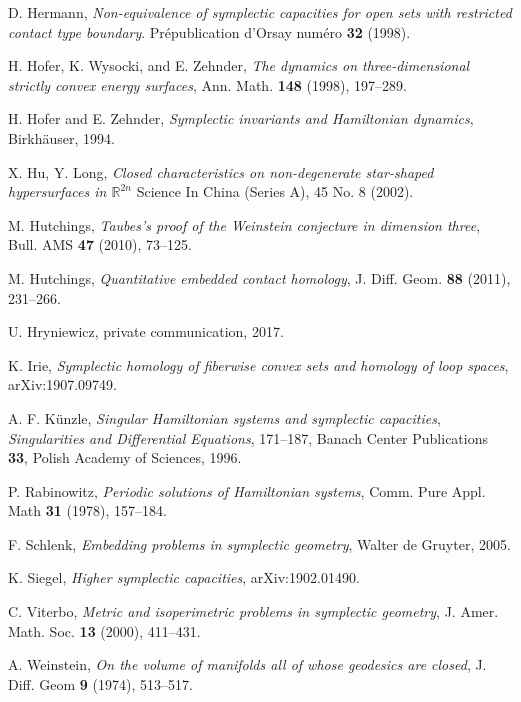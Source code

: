 \documentclass[12pt]{article}
\numberwithin{equation}{section}
\theoremstyle{definition}
\newcommand{\R}{{\mathbb R}}
\begin{document}
\begin{thebibliography}{12}
 D. Hermann, {\em Non-equivalence of symplectic capacities for open sets with restricted contact type boundary\/}. Pr\'{e}publication d'Orsay num\'{e}ro {\bf 32} (1998).

 H. Hofer, K. Wysocki, and E. Zehnder, {\em The dynamics on three-dimensional strictly convex energy surfaces\/}, Ann. Math. {\bf 148} (1998), 197--289.

 H. Hofer and E. Zehnder, {\em Symplectic invariants and Hamiltonian dynamics\/}, Birkh\"auser, 1994.

 X. Hu, Y. Long, \emph{Closed characteristics on non-degenerate star-shaped hypersurfaces in $\R^{2n}$} Science In China (Series A), 45 No. 8 (2002).

 M. Hutchings, {\em Taubes's proof of the Weinstein conjecture in dimension three\/}, Bull. AMS {\bf 47} (2010), 73--125.

 M. Hutchings, {\em Quantitative embedded contact homology\/}, J. Diff. Geom. {\bf 88} (2011), 231--266.

 U. Hryniewicz, private communication, 2017.

 K. Irie, {\em Symplectic homology of fiberwise convex sets and homology of loop spaces\/}, arXiv:1907.09749.

 A. F. K\"unzle, {\em Singular Hamiltonian systems and symplectic capacities\/}, {\em Singularities and Differential Equations\/}, 171--187, Banach Center Publications {\bf 33}, Polish Academy of Sciences, 1996.

 P. Rabinowitz, {\em Periodic solutions of Hamiltonian systems\/}, Comm. Pure Appl. Math {\bf 31} (1978), 157--184.

 F. Schlenk, {\em Embedding problems in symplectic geometry\/}, Walter de Gruyter, 2005.

 K. Siegel, {\em Higher symplectic capacities\/}, arXiv:1902.01490.

 C. Viterbo, {\em Metric and isoperimetric problems in symplectic geometry\/}, J. Amer. Math. Soc. {\bf 13} (2000), 411--431.

 A. Weinstein, {\em On the volume of manifolds all of whose geodesics are closed\/}, J. Diff. Geom {\bf 9} (1974), 513--517.

\end{thebibliography}
\end{document}
